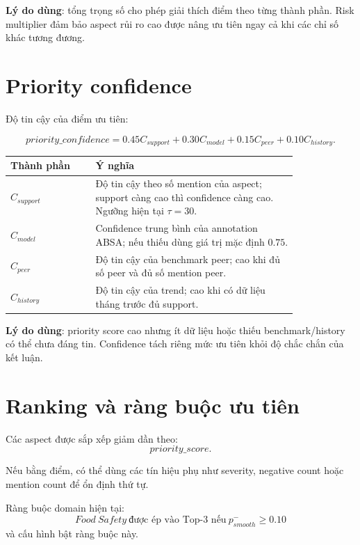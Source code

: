\documentclass[12pt,a4paper]{article}
\begin{document}
\textbf{Lý do dùng}: tổng trọng số cho phép giải thích điểm theo từng thành phần. Risk multiplier đảm bảo aspect rủi ro cao được nâng ưu tiên ngay cả khi các chỉ số khác tương đương.

\section{Priority confidence}

Độ tin cậy của điểm ưu tiên:

\begin{equation}
priority\_confidence
=0.45C_{support}+0.30C_{model}+0.15C_{peer}+0.10C_{history}.
\end{equation}

\begin{longtable}{p{0.24\linewidth}p{0.58\linewidth}}
\toprule
\textbf{Thành phần} & \textbf{Ý nghĩa}\\
\midrule
$C_{support}$ & Độ tin cậy theo số mention của aspect; support càng cao thì confidence càng cao. Ngưỡng hiện tại $\tau=30$.\\
$C_{model}$ & Confidence trung bình của annotation ABSA; nếu thiếu dùng giá trị mặc định $0.75$.\\
$C_{peer}$ & Độ tin cậy của benchmark peer; cao khi đủ số peer và đủ số mention peer.\\
$C_{history}$ & Độ tin cậy của trend; cao khi có dữ liệu tháng trước đủ support.\\
\bottomrule
\end{longtable}

\textbf{Lý do dùng}: priority score cao nhưng ít dữ liệu hoặc thiếu benchmark/history có thể chưa đáng tin. Confidence tách riêng mức ưu tiên khỏi độ chắc chắn của kết luận.

\section{Ranking và ràng buộc ưu tiên}

Các aspect được sắp xếp giảm dần theo:
\begin{equation}
priority\_score.
\end{equation}

Nếu bằng điểm, có thể dùng các tín hiệu phụ như severity, negative count hoặc mention count để ổn định thứ tự.

Ràng buộc domain hiện tại:
\begin{equation}
Food\ Safety\ \text{được ép vào Top-3 nếu}\ p^{-}_{smooth} \ge 0.10
\end{equation}
và cấu hình bật ràng buộc này.
\end{document}
